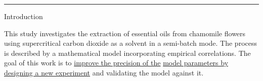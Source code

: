 \documentclass[a0,portrait]{a0poster}
\begin{document}
\noindent\rule{\textwidth}{3pt}


\begin{multicols}{2} %







\begin{tcolorbox}[width=\linewidth, boxrule=0mm, sharp corners=all, colback=white]
	{\LARGE Introduction\\}

This study investigates the extraction of essential oils from chamomile flowers using supercritical carbon dioxide as a solvent in a semi-batch mode. The process is described by a mathematical model incorporating empirical correlations. The goal of this work is to \underline{improve the precision of the} \underline{model parameters by designing a new experiment} and validating the model against it.
\end{tcolorbox}





\end{multicols}
\end{document}

